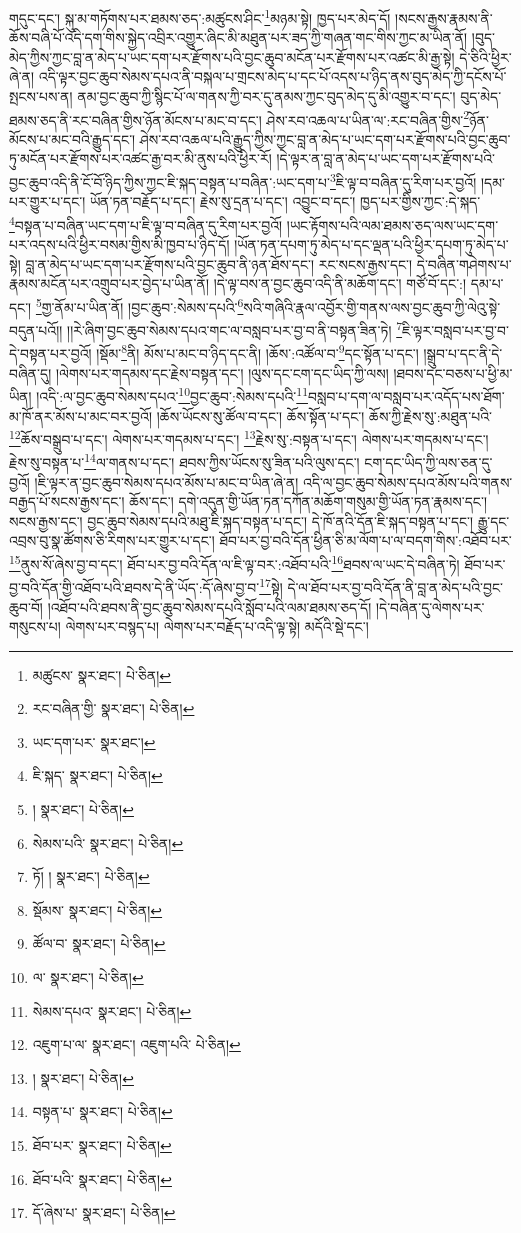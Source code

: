 གདུང་དང་། སྐུ་མ་གཏོགས་པར་ཐམས་ཅད་:མཚུངས་ཤིང་\footnote{མཚུངས་  སྣར་ཐང་།  པེ་ཅིན། }མཉམ་སྟེ། ཁྱད་པར་མེད་དོ། །སངས་རྒྱས་རྣམས་ནི་ཆོས་བཞི་པོ་འདི་དག་གིས་སྐྱེད་འབྲིར་འགྱུར་ཞིང་མི་མཐུན་པར་ཟད་ཀྱི་གཞན་གང་གིས་ཀྱང་མ་ཡིན་ནོ། །བུད་མེད་ཀྱིས་ཀྱང་བླ་ན་མེད་པ་ཡང་དག་པར་རྫོགས་པའི་བྱང་ཆུབ་མངོན་པར་རྫོགས་པར་འཚང་མི་རྒྱ་སྟེ། དེ་ཅིའི་ཕྱིར་ཞེ་ན། འདི་ལྟར་བྱང་ཆུབ་སེམས་དཔའ་ནི་བསྐལ་པ་གྲངས་མེད་པ་དང་པོ་འདས་པ་ཉིད་ནས་བུད་མེད་ཀྱི་དངོས་པོ་སྤངས་པས་ན། ནམ་བྱང་ཆུབ་ཀྱི་སྙིང་པོ་ལ་གནས་ཀྱི་བར་དུ་ནམས་ཀྱང་བུད་མེད་དུ་མི་འགྱུར་བ་དང་། བུད་མེད་ཐམས་ཅད་ནི་རང་བཞིན་གྱིས་ཉོན་མོངས་པ་མང་བ་དང་། ཤེས་རབ་འཆལ་པ་ཡིན་ལ་:རང་བཞིན་གྱིས་\footnote{རང་བཞིན་གྱི་  སྣར་ཐང་།  པེ་ཅིན། }ཉོན་མོངས་པ་མང་བའི་རྒྱུད་དང་། ཤེས་རབ་འཆལ་པའི་རྒྱུད་ཀྱིས་ཀྱང་བླ་ན་མེད་པ་ཡང་དག་པར་རྫོགས་པའི་བྱང་ཆུབ་ཏུ་མངོན་པར་རྫོགས་པར་འཚང་རྒྱ་བར་མི་ནུས་པའི་ཕྱིར་རོ། །དེ་ལྟར་ན་བླ་ན་མེད་པ་ཡང་དག་པར་རྫོགས་པའི་བྱང་ཆུབ་འདི་ནི་ངོ་བོ་ཉིད་ཀྱིས་ཀྱང་ཇི་སྐད་བསྟན་པ་བཞིན་:ཡང་དག་པ་\footnote{ཡང་དག་པར་  སྣར་ཐང་། }ཇི་ལྟ་བ་བཞིན་དུ་རིག་པར་བྱའོ། །དམ་པར་གྱུར་པ་དང་། ཡོན་ཏན་བརྗོད་པ་དང་། རྗེས་སུ་དྲན་པ་དང་། འབྱུང་བ་དང་། ཁྱད་པར་གྱིས་ཀྱང་:དེ་སྐད་\footnote{ཇི་སྐད་  སྣར་ཐང་།  པེ་ཅིན། }བསྟན་པ་བཞིན་ཡང་དག་པ་ཇི་ལྟ་བ་བཞིན་དུ་རིག་པར་བྱའོ། །ཡང་རྟོགས་པའི་ལམ་ཐམས་ཅད་ལས་ཡང་དག་པར་འདས་པའི་ཕྱིར་བསམ་གྱིས་མི་ཁྱབ་པ་ཉིད་དོ། །ཡོན་ཏན་དཔག་ཏུ་མེད་པ་དང་ལྡན་པའི་ཕྱིར་དཔག་ཏུ་མེད་པ་སྟེ། བླ་ན་མེད་པ་ཡང་དག་པར་རྫོགས་པའི་བྱང་ཆུབ་ནི་ཉན་ཐོས་དང་། རང་སངས་རྒྱས་དང་། དེ་བཞིན་གཤེགས་པ་རྣམས་མངོན་པར་འགྲུབ་པར་བྱེད་པ་ཡིན་ནོ། །དེ་ལྟ་བས་ན་བྱང་ཆུབ་འདི་ནི་མཆོག་དང་། གཙོ་བོ་དང་:། དམ་པ་དང་། \footnote{།    སྣར་ཐང་།  པེ་ཅིན། }གྱ་ནོམ་པ་ཡིན་ནོ། །བྱང་ཆུབ་:སེམས་དཔའི་\footnote{སེམས་པའི་  སྣར་ཐང་།  པེ་ཅིན། }སའི་གཞིའི་རྣལ་འབྱོར་གྱི་གནས་ལས་བྱང་ཆུབ་ཀྱི་ལེའུ་སྟེ་བདུན་པའོ།། །།རེ་ཞིག་བྱང་ཆུབ་སེམས་དཔའ་གང་ལ་བསླབ་པར་བྱ་བ་ནི་བསྟན་ཟིན་ཏེ། \footnote{ཏོ། །   སྣར་ཐང་།  པེ་ཅིན། }ཇི་ལྟར་བསླབ་པར་བྱ་བ་དེ་བསྟན་པར་བྱའོ། །སྡོམ་\footnote{སྡོམས་  སྣར་ཐང་།  པེ་ཅིན། }ནི། མོས་པ་མང་བ་ཉིད་དང་ནི། །ཆོས་:འཚོལ་བ་\footnote{ཚོལ་བ་  སྣར་ཐང་།  པེ་ཅིན། }དང་སྟོན་པ་དང་། །སྒྲུབ་པ་དང་ནི་དེ་བཞིན་དུ། །ལེགས་པར་གདམས་དང་རྗེས་བསྟན་དང་། །ལུས་དང་ངག་དང་ཡིད་ཀྱི་ལས། །ཐབས་དང་བཅས་པ་ཕྱི་མ་ཡིན། །འདི་:ལ་བྱང་ཆུབ་སེམས་དཔའ་\footnote{ལ་  སྣར་ཐང་།  པེ་ཅིན། }བྱང་ཆུབ་:སེམས་དཔའི་\footnote{སེམས་དཔའ་  སྣར་ཐང་།  པེ་ཅིན། }བསླབ་པ་དག་ལ་བསླབ་པར་འདོད་པས་ཐོག་མ་ཁོ་ནར་མོས་པ་མང་བར་བྱའོ། །ཆོས་ཡོངས་སུ་ཚོལ་བ་དང་། ཆོས་སྟོན་པ་དང་། ཆོས་ཀྱི་རྗེས་སུ་:མཐུན་པའི་\footnote{འཇུག་པ་ལ་  སྣར་ཐང་། འཇུག་པའི་  པེ་ཅིན། }ཆོས་བསྒྲུབ་པ་དང་། ལེགས་པར་གདམས་པ་དང་། \footnote{།    སྣར་ཐང་།  པེ་ཅིན། }རྗེས་སུ་:བསྟན་པ་དང་། ལེགས་པར་གདམས་པ་དང་། རྗེས་སུ་བསྟན་པ་\footnote{བསྟན་པ་  སྣར་ཐང་།  པེ་ཅིན། }ལ་གནས་པ་དང་། ཐབས་ཀྱིས་ཡོངས་སུ་ཟིན་པའི་ལུས་དང་། ངག་དང་ཡིད་ཀྱི་ལས་ཅན་དུ་བྱའོ། །ཇི་ལྟར་ན་བྱང་ཆུབ་སེམས་དཔའ་མོས་པ་མང་བ་ཡིན་ཞེ་ན། འདི་ལ་བྱང་ཆུབ་སེམས་དཔའ་མོས་པའི་གནས་བརྒྱད་པོ་སངས་རྒྱས་དང་། ཆོས་དང་། དགེ་འདུན་གྱི་ཡོན་ཏན་དཀོན་མཆོག་གསུམ་གྱི་ཡོན་ཏན་རྣམས་དང་། སངས་རྒྱས་དང་། བྱང་ཆུབ་སེམས་དཔའི་མཐུ་ཇི་སྐད་བསྟན་པ་དང་། དེ་ཁོ་ནའི་དོན་ཇི་སྐད་བསྟན་པ་དང་། རྒྱུ་དང་འབྲས་བུ་སྣ་ཚོགས་ཅི་རིགས་པར་གྱུར་པ་དང་། ཐོབ་པར་བྱ་བའི་དོན་ཕྱིན་ཅི་མ་ལོག་པ་ལ་བདག་གིས་:འཐོབ་པར་\footnote{ཐོབ་པར་  སྣར་ཐང་།  པེ་ཅིན། }ནུས་སོ་ཞེས་བྱ་བ་དང་། ཐོབ་པར་བྱ་བའི་དོན་ལ་ཇི་ལྟ་བར་:འཐོབ་པའི་\footnote{ཐོབ་པའི་  སྣར་ཐང་།  པེ་ཅིན། }ཐབས་ལ་ཡང་དེ་བཞིན་ཏེ། ཐོབ་པར་བྱ་བའི་དོན་གྱི་འཐོབ་པའི་ཐབས་དེ་ནི་ཡོད་:དོ་ཞེས་བྱ་བ་\footnote{དོ་ཞེས་པ་  སྣར་ཐང་།  པེ་ཅིན། }སྟེ། དེ་ལ་ཐོབ་པར་བྱ་བའི་དོན་ནི་བླ་ན་མེད་པའི་བྱང་ཆུབ་བོ། །འཐོབ་པའི་ཐབས་ནི་བྱང་ཆུབ་སེམས་དཔའི་སློབ་པའི་ལམ་ཐམས་ཅད་དོ། །དེ་བཞིན་དུ་ལེགས་པར་གསུངས་པ། ལེགས་པར་བསྙད་པ། ལེགས་པར་བརྗོད་པ་འདི་ལྟ་སྟེ། མདོའི་སྡེ་དང་། 